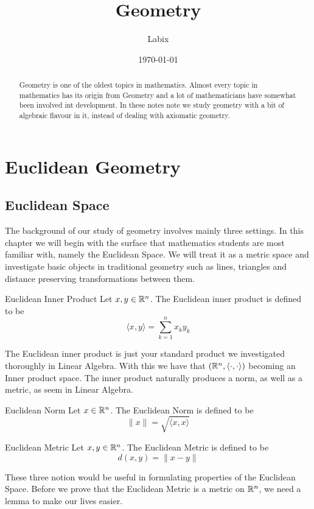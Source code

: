 \documentclass[a4paper]{article}
\title{Geometry}
\author{Labix}
\date{\today}
\begin{document}
\maketitle
\begin{abstract}
Geometry is one of the oldest topics in mathematics. Almost every topic in mathematics has its origin from Geometry and a lot of mathematicians have somewhat been involved int development. In these notes note we study geometry with a bit of algebraic flavour in it, instead of dealing with axiomatic geometry. 
\end{abstract}
\tableofcontents
\pagebreak
\section{Euclidean Geometry}
\subsection{Euclidean Space}
The background of our study of geometry involves mainly three settings. In this chapter we will begin with the surface that mathematics students are most familiar with, namely the Euclidean Space. We will treat it as a metric space and investigate basic objects in traditional geometry such as lines, triangles and distance preserving transformations between them. 

\begin{defn}{Euclidean Inner Product}{} Let $x,y\in \mathbb{R}^n$. The Euclidean inner product is defined to be $$\langle x,y\rangle=\sum_{k=1}^nx_ky_k$$
\end{defn}

The Euclidean inner product is just your standard product we investigated thoroughly in Linear Algebra. With this we have that $(\mathbb{R}^n,\langle\cdot,\cdot\rangle)$ becoming an Inner product space. The inner product naturally produces a norm, as well as a metric, as seem in Linear Algebra. 

\begin{defn}{Euclidean Norm}{} Let $x\in \mathbb{R}^n$. The Euclidean Norm is defined to be $$\|x\|=\sqrt{\langle x,x\rangle}$$
\end{defn}

\begin{defn}{Euclidean Metric}{} Let $x,y\in \mathbb{R}^n$. The Euclidean Metric is defined to be $$d(x,y)=\|x-y\|$$
\end{defn}

These three notion would be useful in formulating properties of the Euclidean Space. Before we prove that the Euclidean Metric is a metric on $\mathbb{R}^n$, we need a lemma to make our lives easier. 
\end{document}
